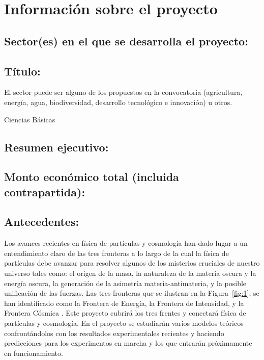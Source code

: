 
\section{Información sobre el proyecto}

\subsection{Sector(es)  en el que se desarrolla el proyecto:}


\subsection{Título:                                        }
\begin{instrucciones}
  El sector puede ser alguno de los propuestos en la convocatoria
  (agricultura, energía, agua, biodiversidad, desarrollo tecnológico e
  innovación) u otros.
\end{instrucciones}
Ciencias Básicas
\subsection{Resumen ejecutivo:                            }
\subsection{Monto económico total (incluida contrapartida):}
\subsection{Antecedentes:                                  }
Los avances recientes en física de partículas y cosmología han dado
lugar a un entendimiento claro de las tres fronteras a lo largo de la
cual la física de partículas debe avanzar para resolver algunos de los
misterios cruciales de nuestro universo tales como: el origen de la
masa, la naturaleza de la materia oscura y la energía oscura, la
generación de la asimetría materia-antimateria, y la posible
unificación de las fuerzas. Las tres fronteras que se ilustran en la
Figura~\ref{fig:1}, se han identificado como la Frontera de Energía,
la Frontera de Intensidad, y la Frontera Cósmica \cite{fermilab}. Este
proyecto cubrirá los tres frentes y conectará física de partículas y
cosmología. En el proyecto se estudiarán varios modelos teóricos
confrontándolos con los resultados experimentales recientes y haciendo
predicciones para los experimentos en marcha y los que entrarán
próximamente en funcionamiento.

